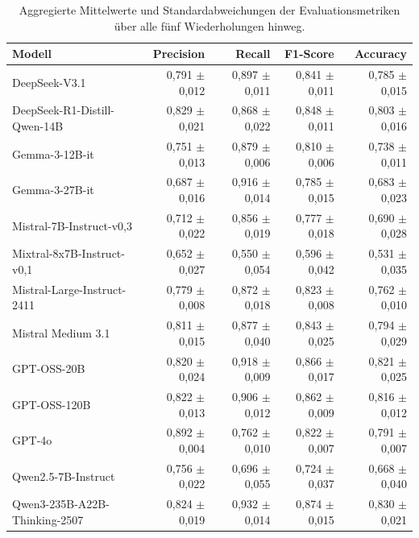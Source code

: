 \begin{table}[htbp]
    \centering
    \caption{Aggregierte Mittelwerte und Standardabweichungen der Evaluationsmetriken über alle fünf Wiederholungen hinweg.}
    \label{tab:metrics-overview}
    \begin{adjustbox}{width=\textwidth}
        \begin{tabular}{l r r r r}
            \toprule
            Modell                          & Precision         & Recall            & F1-Score          & Accuracy \\
            \midrule
            DeepSeek-V3.1                   & 0,791 $\pm$ 0,012 & 0,897 $\pm$ 0,011 & 0,841 $\pm$ 0,011 & 0,785 $\pm$ 0,015 \\
            DeepSeek-R1-Distill-Qwen-14B    & 0,829 $\pm$ 0,021 & 0,868 $\pm$ 0,022 & 0,848 $\pm$ 0,011 & 0,803 $\pm$ 0,016 \\
            Gemma-3-12B-it                  & 0,751 $\pm$ 0,013 & 0,879 $\pm$ 0,006 & 0,810 $\pm$ 0,006 & 0,738 $\pm$ 0,011 \\
            Gemma-3-27B-it                  & 0,687 $\pm$ 0,016 & 0,916 $\pm$ 0,014 & 0,785 $\pm$ 0,015 & 0,683 $\pm$ 0,023 \\
            Mistral-7B-Instruct-v0,3        & 0,712 $\pm$ 0,022 & 0,856 $\pm$ 0,019 & 0,777 $\pm$ 0,018 & 0,690 $\pm$ 0,028 \\
            Mixtral-8x7B-Instruct-v0,1      & 0,652 $\pm$ 0,027 & 0,550 $\pm$ 0,054 & 0,596 $\pm$ 0,042 & 0,531 $\pm$ 0,035 \\
            Mistral-Large-Instruct-2411     & 0,779 $\pm$ 0,008 & 0,872 $\pm$ 0,018 & 0,823 $\pm$ 0,008 & 0,762 $\pm$ 0,010 \\
            Mistral Medium 3.1              & 0,811 $\pm$ 0,015 & 0,877 $\pm$ 0,040 & 0,843 $\pm$ 0,025 & 0,794 $\pm$ 0,029 \\
            GPT-OSS-20B                     & 0,820 $\pm$ 0,024 & 0,918 $\pm$ 0,009 & 0,866 $\pm$ 0,017 & 0,821 $\pm$ 0,025 \\
            GPT-OSS-120B                    & 0,822 $\pm$ 0,013 & 0,906 $\pm$ 0,012 & 0,862 $\pm$ 0,009 & 0,816 $\pm$ 0,012 \\
            GPT-4o                          & 0,892 $\pm$ 0,004 & 0,762 $\pm$ 0,010 & 0,822 $\pm$ 0,007 & 0,791 $\pm$ 0,007 \\
            Qwen2.5-7B-Instruct             & 0,756 $\pm$ 0,022 & 0,696 $\pm$ 0,055 & 0,724 $\pm$ 0,037 & 0,668 $\pm$ 0,040 \\
            Qwen3-235B-A22B-Thinking-2507   & 0,824 $\pm$ 0,019 & 0,932 $\pm$ 0,014 & 0,874 $\pm$ 0,015 & 0,830 $\pm$ 0,021 \\
            \bottomrule
        \end{tabular}
    \end{adjustbox}
\end{table}

